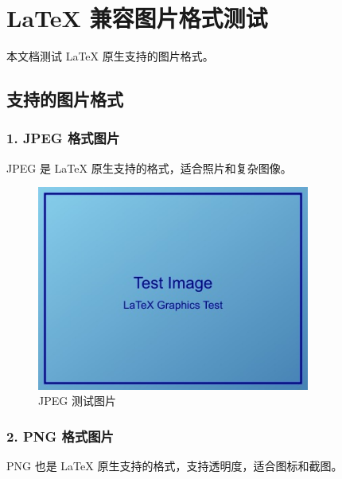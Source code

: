 \documentclass[UTF8, a4paper, 12pt]{ctexart}
\begin{document}
\section{LaTeX 兼容图片格式测试}


本文档测试 LaTeX 原生支持的图片格式。


\subsection{支持的图片格式}


\subsubsection{1. JPEG 格式图片}


JPEG 是 LaTeX 原生支持的格式，适合照片和复杂图像。


\begin{figure}[H]
    \centering
    \includegraphics[width=0.8\textwidth]{../../tests/images/test_image.jpg}
    \caption{JPEG 测试图片}
    \label{fig:jpeg_____}
\end{figure}



\subsubsection{2. PNG 格式图片}


PNG 也是 LaTeX 原生支持的格式，支持透明度，适合图标和截图。
\end{document}

